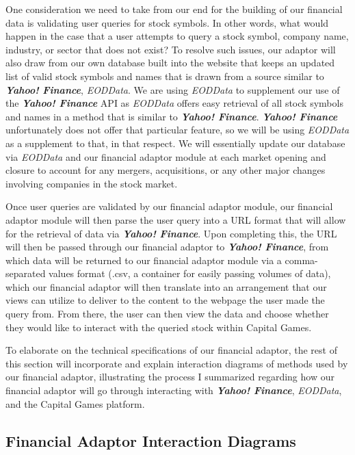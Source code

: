 One consideration we need to take from our end for the building of our financial data is validating user queries for stock symbols. In other words, what would happen in the case that a user attempts to query a stock symbol, company name, industry, or sector that does not exist? To resolve such issues, our adaptor will also draw from our own database built into the website that keeps an updated list of valid stock symbols and names that is drawn from a source similar to {\textit{\textbf{Yahoo! Finance}}}, {\textit{EODData}}. We are using {\textit{EODData}} to supplement our use of the {\textit{\textbf{Yahoo! Finance}}} API as {\textit{EODData}} offers easy retrieval of all stock symbols and names in a method that is similar to {\textit{\textbf{Yahoo! Finance}}}. {\textit{\textbf{Yahoo! Finance}}} unfortunately does not offer that particular feature, so we will be using {\textit{EODData}} as a supplement to that, in that respect. We will essentially update our database via {\textit{EODData}} and our financial adaptor module at each market opening and closure to account for any mergers, acquisitions, or any other major changes involving companies in the stock market.

Once user queries are validated by our financial adaptor module, our financial adaptor module will then parse the user query into a URL format that will allow for the retrieval of data via {\textit{\textbf{Yahoo! Finance}}}. Upon completing this, the URL will then be passed through our financial adaptor to {\textit{\textbf{Yahoo! Finance}}}, from which data will be returned to our financial adaptor module via a comma-separated values format (.csv, a container for easily passing volumes of data), which our financial adaptor will then translate into an arrangement that our views can utilize to deliver to the content to the webpage the user made the query from.  From there, the user can then view the data and choose whether they would like to interact with the queried stock within Capital Games.

To elaborate on the technical specifications of our financial adaptor, the rest of this section will incorporate and explain interaction diagrams of methods used by our financial adaptor, illustrating the process I summarized regarding how our financial adaptor will go through interacting with {\textit{\textbf{Yahoo! Finance}}}, {\textit{EODData}}, and the Capital Games platform.

\subsection{Financial Adaptor Interaction Diagrams}

